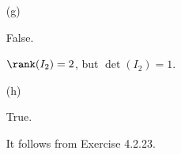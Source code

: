 \begin{Exercise}
\begin{enumerate}[(a)]
		\item[(g)]
		\begin{answer}
			False.
		\end{answer}
		\begin{solution}
			$\rank(I_2) = 2$, but $\det(I_2) = 1$.
		\end{solution}
		
		\item[(h)]
		\begin{answer}
			True.
		\end{answer}
		\begin{solution}
			It follows from Exercise 4.2.23.
		\end{solution}
		
	\end{enumerate}
\end{Exercise}